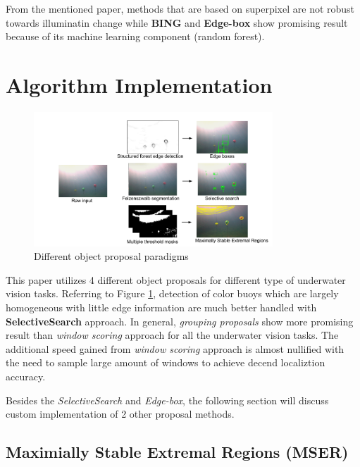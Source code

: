 \documentclass[fypca]{socreport}
\begin{document}
From the mentioned paper, methods that are based on superpixel are not robust
towards illuminatin change while \textbf{BING}  and
\textbf{Edge-box}  show promising result because of its
machine learning component (random forest).

\section{Algorithm Implementation}

\begin{figure}[H]
\centering
  \includegraphics[width=0.8\textwidth, height=0.3\textheight]{proposals_results.png}
  \caption{Different object proposal paradigms}
  \label{fig:proposal_results}
\end{figure}

This paper utilizes 4 different object proposals for different type of
underwater vision tasks. Referring to Figure \ref{fig:proposal_results},
detection of color buoys which are largely homogeneous with little edge
information are much better handled with \textbf{SelectiveSearch}
 approach. In general, \textit{grouping
  proposals} show more promising result than \textit{window scoring} approach
for all the underwater vision tasks. The additional speed gained from
\textit{window scoring} approach is almost nullified with the need to sample
large amount of windows to achieve decend localiztion accuracy.

Besides the \textit{SelectiveSearch} and \textit{Edge-box}, the following
section will discuss custom implementation of 2 other proposal methods.

\subsection{Maximially Stable Extremal Regions (MSER)}
\end{document}
